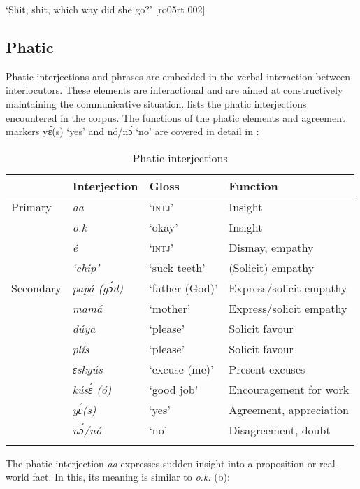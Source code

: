 \glt ‘Shit, shit, which way did she go?’ [ro05rt 002]
\z

\subsection{Phatic}\label{sec:12.2.2}

Phatic interjections and phrases are embedded in the verbal interaction between interlocutors. These elements are interactional and are aimed at constructively maintaining the communicative situation.  lists the phatic interjections encountered in the corpus. The functions of the phatic elements and agreement markers yɛ́(s) ‘yes’ and nó/nɔ́ ‘no’ are covered in detail in :

\begin{table}
\caption{Phatic interjections}
\label{tab:key:12.3}

\begin{tabularx}{\textwidth}{Xlll}
\lsptoprule
 & Interjection & Gloss & Function\\
\midrule
 Primary & \itshape aa & ‘\textsc{intj}’ & Insight\\
& \itshape o.k & ‘okay’ & Insight\\
& \itshape é & ‘\textsc{intj}’ & Dismay, empathy\\
& \itshape \textup{‘chip’} & ‘suck teeth’ & (Solicit) empathy\\

\tablevspace
Secondary & \itshape papá (gɔ́d) & ‘father (God)’ & Express/solicit empathy\\
& \itshape mamá & ‘mother’ & Express/solicit empathy\\
& \itshape dúya & ‘please’ & Solicit favour\\
& \itshape plís & ‘please’ & Solicit favour\\
& \itshape ɛskyús & ‘excuse (me)’ & Present excuses\\
& \itshape kúsɛ́ (ó) & ‘good job’ & Encouragement for work\\
& \itshape yɛ́(s) & ‘yes’ & Agreement, appreciation\\
& \itshape nɔ́/nó & ‘no’ & Disagreement, doubt\\
\lspbottomrule
\end{tabularx}
\end{table}
The phatic interjection \textit{aa} expresses sudden insight into a proposition or real-world fact. In this, its meaning is similar to \textit{o.k.} (b):



